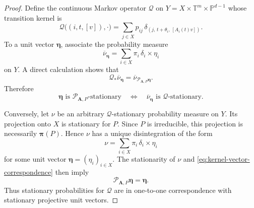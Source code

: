 \documentclass[11pt,a4paper]{amsart}
\newcommand{\T}{\mathbb T}
\newcommand{\PP}{\mathbb P}
\begin{document}
\begin{proof}

Define the continuous Markov operator \(\mathcal Q\) on
$
 Y=X\times\T^m\times\PP^{d-1}
$
whose transition kernel is
\begin{equation}\label{eq:projective-Markov-kernel}
 \mathcal Q\bigl((i,t,[v]),\cdot\bigr)
 =
 \sum_{j\in X}p_{ij}\,
 \delta_{\left(
 j,\,
 t+\theta_i,\,
 [A_i(t)v]
 \right)}.
\end{equation}
To a unit vector \(\boldsymbol\eta\), associate the probability
measure
\begin{equation}\label{eq:kernel-measure-from-vector}
 \overline\nu_{\boldsymbol\eta}
 =
 \sum_{i\in X}\pi_i\,\delta_i\times\eta_i
\end{equation}
on \(Y\).  A direct calculation shows that
\begin{equation}\label{eq:kernel-vector-correspondence}
 \mathcal Q_*\overline\nu_{\boldsymbol\eta}
 =
 \overline\nu_{
 \mathcal P_{\mathbf A,P}\boldsymbol\eta}.
\end{equation}
Therefore
\[
 \boldsymbol\eta
 \text{ is \(\mathcal P_{\mathbf A,P}\)-stationary}
 \quad\Longleftrightarrow\quad
 \overline\nu_{\boldsymbol\eta}
 \text{ is \(\mathcal Q\)-stationary}.
\]

Conversely, let \(\nu\) be an arbitrary \(\mathcal Q\)-stationary
probability measure on \(Y\).  Its projection onto \(X\) is stationary
for \(P\).  Since \(P\) is irreducible, this projection is necessarily
\(\boldsymbol\pi(P)\).  Hence \(\nu\) has a unique disintegration of
the form
\[
 \nu
 =
 \sum_{i\in X}\pi_i\,\delta_i\times\eta_i
\]
for some unit vector
\(\boldsymbol\eta=(\eta_i)_{i\in X}\).  The stationarity of \(\nu\)
and \eqref{eq:kernel-vector-correspondence} then imply
\[
 \mathcal P_{\mathbf A,P}\boldsymbol\eta
 =
 \boldsymbol\eta.
\]
Thus stationary probabilities for \(\mathcal Q\) are in one-to-one
correspondence with stationary projective unit vectors.


\end{proof}
\end{document}

